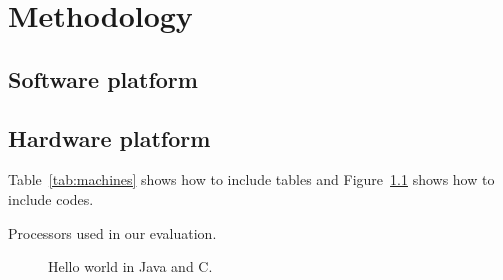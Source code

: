 \chapter{Methodology}
\label{cha:methodology}

\section{Software platform}
\label{sec:softplat}



\section{Hardware platform}
\label{sec:hardplat}

Table~\ref{tab:machines} shows how to include tables and Figure~\ref{fig:helloworld} shows how to include codes.
\begin{table*}
  \centering
  
  \caption{Processors used in our evaluation.}
  \label{tab:machines}
\end{table*}



\begin{figure}
  \centering
  \subfigure[\label{fig:c:hello}]{
  \begin{minipage}[b]{\columnwidth}
    \vspace*{-2ex}
  \end{minipage}}
  \subfigure[\label{fig:java:hello}]{
  \begin{minipage}[b]{\columnwidth}
    \vspace*{-2ex}
  \end{minipage}}
  \caption{Hello world in Java and C.}
  \label{fig:helloworld}
\end{figure}



